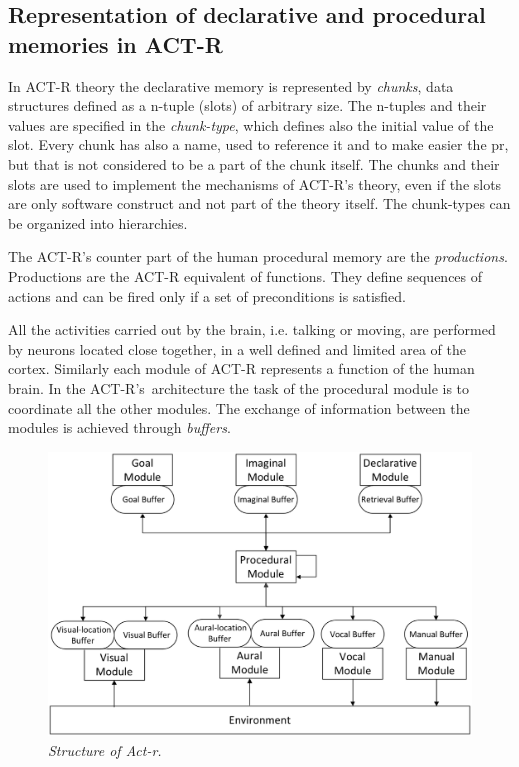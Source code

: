 	\subsection*{Representation of declarative and procedural memories in ACT-R}
	In \mbox{ACT-R} theory the declarative memory is represented by \emph{chunks}, data structures defined as a n-tuple (slots) of arbitrary size. The n-tuples and their values are specified in the \emph{chunk-type}, which defines also the initial value of the slot. Every chunk has also a name, used to reference it and to make easier the pr, but that is not considered to be a part of the chunk itself. The chunks and their slots are used to implement the mechanisms of \mbox{ACT-R's} theory, even if the slots are only software construct and not part of the theory itself. The chunk-types can be organized into hierarchies.

	The \mbox{ACT-R's} counter part of the human procedural memory are the \emph{productions}. Productions are the \mbox{ACT-R} equivalent of functions. They define sequences of actions and can be fired only if a set of preconditions is satisfied.  

	All the activities carried out by the brain, i.e. talking or moving, are performed by neurons located close together, in a well defined and limited area of the cortex. Similarly each module of \mbox{ACT-R} represents a function of the human brain. In the \mbox{ACT-R's architecture} the task of the procedural module is to coordinate all the other modules. The exchange of information between the modules is achieved through \emph{buffers}.

	\begin{figure}[h]
	  \begin{center} 
	    \includegraphics[scale=0.25]{images/ch_01/actr.eps}
	  \end{center} 
	  \caption{\textit{Structure of Act-r.}}  
	  \label{fig:modulesActr}
	\end{figure}
	

